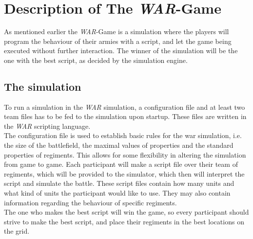 
\section{ Description of The \textit{WAR}-Game }
\label{sec:describeWAR}
As mentioned earlier the \textit{WAR}-Game is a simulation where the players will program the behaviour of their armies with a script, and let the game being executed without further interaction. The winner of the simulation will be the one with the best script, as decided by the simulation engine. \\
	\subsection{The simulation}
		To run a simulation in the \textit{WAR} simulation, a configuration file and at least two team files has to be fed to the simulation upon startup. 
		These files are written in the \textit{WAR} scripting language.
		\\
		The configuration file is used to establish basic rules for the war simulation, i.e. the size of the battlefield, the maximal values of properties and the standard properties of regiments.
		This allows for some flexibility in altering the simulation from game to game.
		Each participant will make a script file over their team of regiments, which will be provided to the simulator, 
		which then will interpret the script and simulate the battle. 
		These script files contain how many units and what kind of units the participant would like to use. 
		They may also contain information regarding the behaviour of specific regiments. 
		\\
		The one who makes the best script will win the game, so every participant should strive to make the best script, 
		and place their regiments in the best locations on the grid.
		\\

